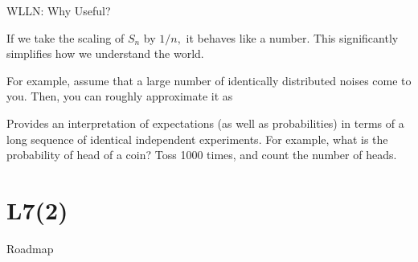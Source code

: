 \begin{frame}{WLLN: Why Useful?}
 \plitemsep 0.1in
 \bci
\item<2-> If we take the scaling of $S_n$ by $1/n,$ it behaves like a  number. This significantly simplifies how we understand the world.

\item<3-> For example, assume that a large number of identically distributed noises come to you. Then, you can roughly approximate it as 

\item<4-> Provides an interpretation of expectations (as well as probabilities) in terms of a long sequence of identical independent experiments. For example, what is the probability of head of a coin? Toss 1000 times, and count the number of heads.
\eci
\end{frame}




\section{L7(2)}
\begin{frame}{Roadmap}

\plitemsep 0.15in

\bce[(1)]

\item {}
\item {}
\item {}
\ece

\end{frame}




